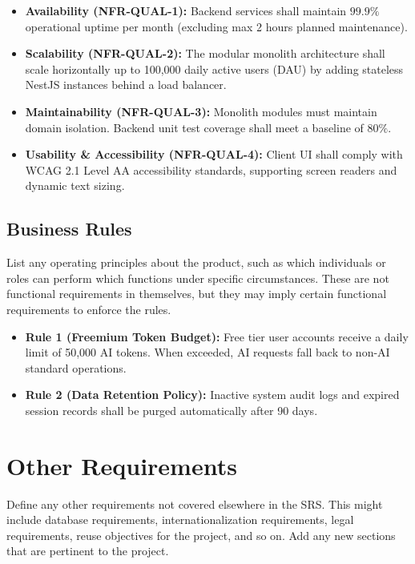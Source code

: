 \documentclass[11pt,a4paper]{article}
\begin{document}
\begin{itemize}
    \item \textbf{Availability (NFR-QUAL-1):} Backend services shall maintain $99.9\%$ operational uptime per month (excluding max 2 hours planned maintenance).
    \item \textbf{Scalability (NFR-QUAL-2):} The modular monolith architecture shall scale horizontally up to 100,000 daily active users (DAU) by adding stateless NestJS instances behind a load balancer.
    \item \textbf{Maintainability (NFR-QUAL-3):} Monolith modules must maintain domain isolation. Backend unit test coverage shall meet a baseline of $80\%$.
    \item \textbf{Usability \& Accessibility (NFR-QUAL-4):} Client UI shall comply with WCAG 2.1 Level AA accessibility standards, supporting screen readers and dynamic text sizing.
\end{itemize}

\subsection{Business Rules}
List any operating principles about the product, such as which individuals or roles can perform which functions under specific circumstances. These are not functional requirements in themselves, but they may imply certain functional requirements to enforce the rules.

\begin{itemize}
    \item \textbf{Rule 1 (Freemium Token Budget):} Free tier user accounts receive a daily limit of 50,000 AI tokens. When exceeded, AI requests fall back to non-AI standard operations.
    \item \textbf{Rule 2 (Data Retention Policy):} Inactive system audit logs and expired session records shall be purged automatically after 90 days.
\end{itemize}

\newpage
\section{Other Requirements}

Define any other requirements not covered elsewhere in the SRS. This might include database requirements, internationalization requirements, legal requirements, reuse objectives for the project, and so on. Add any new sections that are pertinent to the project.
\end{document}
